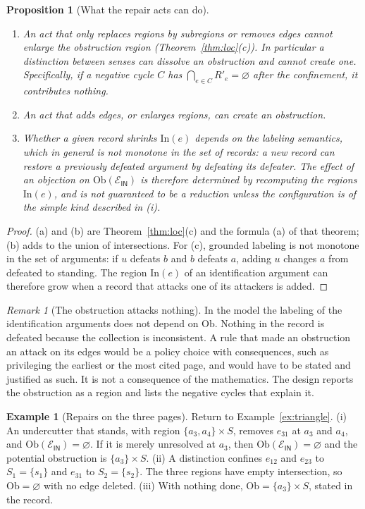 \documentclass[11pt]{article}
\theoremstyle{plain}
\newtheorem{proposition}[theorem]{Proposition}
\theoremstyle{definition}
\newtheorem{example}[theorem]{Example}
\theoremstyle{remark}
\newtheorem{remark}[theorem]{Remark}
\newcommand{\Ob}{\mathrm{Ob}}
\newcommand{\IN}{\textsf{IN}}
\begin{document}
\begin{proposition}[What the repair acts can do]\label{prop:repair}
\begin{enumerate}[label=(\alph*)]
\item An act that only replaces regions by subregions or removes edges cannot enlarge the obstruction region (Theorem~\ref{thm:loc}(c)). In particular a distinction between senses can dissolve an obstruction and cannot create one. Specifically, if a negative cycle $C$ has $\bigcap_{e\in C}R'_e=\varnothing$ after the confinement, it contributes nothing.
\item An act that adds edges, or enlarges regions, can create an obstruction.
\item Whether a given record shrinks $\mathrm{In}(e)$ depends on the labeling semantics, which in general is not monotone in the set of records: a new record can restore a previously defeated argument by defeating its defeater. The effect of an objection on $\Ob(\mathcal E_{\IN})$ is therefore determined by recomputing the regions $\mathrm{In}(e)$, and is not guaranteed to be a reduction unless the configuration is of the simple kind described in (i).
\end{enumerate}
\end{proposition}

\begin{proof}
(a) and (b) are Theorem~\ref{thm:loc}(c) and the formula (a) of that theorem; (b) adds to the union of intersections. For (c), grounded labeling is not monotone in the set of arguments: if $u$ defeats $b$ and $b$ defeats $a$, adding $u$ changes $a$ from defeated to standing. The region $\mathrm{In}(e)$ of an identification argument can therefore grow when a record that attacks one of its attackers is added.
\end{proof}

\begin{remark}[The obstruction attacks nothing]
In the model the labeling of the identification arguments does not depend on $\Ob$. Nothing in the record is defeated because the collection is inconsistent. A rule that made an obstruction an attack on its edges would be a policy choice with consequences, such as privileging the earliest or the most cited page, and would have to be stated and justified as such. It is not a consequence of the mathematics. The design reports the obstruction as a region and lists the negative cycles that explain it.
\end{remark}

\begin{example}[Repairs on the three pages]\label{ex:repairs}
Return to Example~\ref{ex:triangle}. (i) An undercutter that stands, with region $\{a_3,a_4\}\times S$, removes $e_{31}$ at $a_3$ and $a_4$, and $\Ob(\mathcal E_{\IN})=\varnothing$. If it is merely unresolved at $a_3$, then $\Ob(\mathcal E_{\IN})=\varnothing$ and the potential obstruction is $\{a_3\}\times S$. (ii) A distinction confines $e_{12}$ and $e_{23}$ to $S_1=\{s_1\}$ and $e_{31}$ to $S_2=\{s_2\}$. The three regions have empty intersection, so $\Ob=\varnothing$ with no edge deleted. (iii) With nothing done, $\Ob=\{a_3\}\times S$, stated in the record.
\end{example}
\end{document}
